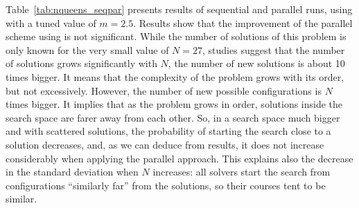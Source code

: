 Table~\ref{tab:nqueens_seqpar} presents results of sequential and parallel runs, using  with a tuned value of $m=2.5$. Results show that the improvement of the parallel scheme using \posl{} is not significant. While the number of solutions of this problem is only known for the very small value of $N = 27$, studies suggest that the number of solutions grows significantly with $N$, \ie the number of new solutions is about 10 times bigger. It means that the complexity of the problem grows with its order, but not excessively. However, the number of new possible configurations is $N$ times bigger. It implies that as the problem grows in order, solutions inside the search space are farer away from each other. So, in a search space much bigger and with scattered solutions, the probability of starting the search close to a solution decreases, and, as we can deduce from results, it does not increase considerably when applying the parallel approach. This explains also the decrease in the standard deviation when $N$ increases: all solvers start the search from configurations ``similarly far'' from the solutions, so their courses tent to be similar.


\begin{table}[t]
\centering 
\renewcommand{\arraystretch}{1}
\caption{Results for \NQP{} (sequential and parallel without communication)}\label{tab:nqueens_seqpar}
\end{table}

